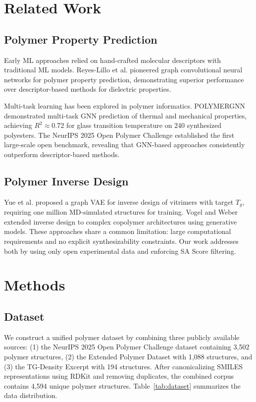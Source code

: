 \documentclass{article}
\begin{document}
\section{Related Work}

\subsection{Polymer Property Prediction}

Early ML approaches relied on hand-crafted molecular descriptors with traditional
ML models. Reyes-Lillo et al. \citep{gcnn_polymer_2018} pioneered graph convolutional neural networks
for polymer property prediction, demonstrating superior performance over
descriptor-based methods for dielectric properties.

Multi-task learning has been explored in polymer informatics.
POLYMERGNN \citep{polymergnn_2023} demonstrated multi-task GNN prediction
of thermal and mechanical properties, achieving $R^2 \approx 0.72$ for glass
transition temperature on 240 synthesized polyesters.
The NeurIPS 2025 Open Polymer Challenge \citep{neurips_opc_2025} established
the first large-scale open benchmark, revealing that GNN-based approaches
consistently outperform descriptor-based methods.

\subsection{Polymer Inverse Design}

Yue et al. \citep{vitrimer_inverse_2023} proposed a graph VAE for inverse design of vitrimers
with target $T_g$, requiring one million MD-simulated structures for training.
Vogel and Weber \citep{copolymer_inverse_2024} extended inverse design to complex copolymer
architectures using generative models.
These approaches share a common limitation: large computational requirements
and no explicit synthesizability constraints. Our work addresses both by using
only open experimental data and enforcing SA Score filtering.

\section{Methods}

\subsection{Dataset}

We construct a unified polymer dataset by combining three publicly available sources:
(1) the NeurIPS 2025 Open Polymer Challenge dataset \citep{neurips_opc_2025} containing
3,502 polymer structures, (2) the Extended Polymer Dataset with 1,088 structures,
and (3) the TG-Density Excerpt with 194 structures. After canonicalizing SMILES
representations using RDKit and removing duplicates, the combined corpus contains
4,594 unique polymer structures. Table~\ref{tab:dataset} summarizes the data distribution.
\end{document}
